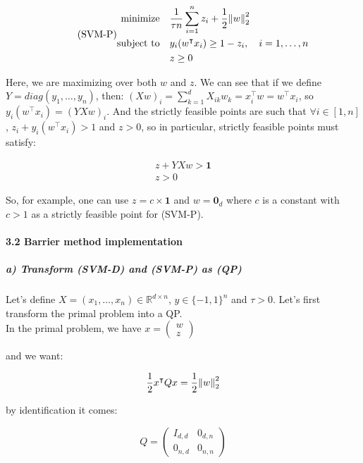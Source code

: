 \documentclass[11pt]{article}
\numberwithin{figure}{section} %
\begin{document}
\begin{equation}\tag*{(SVM-P)}
	\begin{split}
	\text{minimize} \quad & \frac{1}{\tau n} \sum\limits_{i=1}^n z_i + \frac{1}{2} \norm{w}^{2}_2 \\
	\text{subject to} \quad & y_i(w^{\intercal} x_i) \geq 1 - z_i, \quad i=1, \hdots, n \\
	& z \geq 0
	\end{split}
\end{equation}

Here, we are maximizing over both $w$ and $z$. We can see that if we define $Y = diag(y_1, \hdots, y_n)$, then:
$(Xw)_i = \sum\limits_{k=1}^d X_{ik}w_k = x^{\intercal}_i w = w^{\intercal} x_i$, so $y_i(w^{\intercal} x_i) =(YXw)_i$.
And the strictly feasible points are such that $\forall i \in [1,n]$, $z_i + y_i(w^{\intercal} x_i) > 1$ and $z > 0$, so
in particular, strictly feasible points must satisfy:

\begin{align*}
z + YXw > \mathbf{1} \\
z > 0
\end{align*}

So, for example, one can use $z = c \times \mathbf{1}$ and $w = \mathbf{0}_{d}$ where $c$ is a constant with $c > 1$ as a strictly feasible point for (SVM-P).

\paragraph{3.2 Barrier method implementation}
\subparagraph{a) Transform (SVM-D) and (SVM-P) as (QP)}
Let's define $X = (x_1, \hdots, x_n) \in \mathbb{R}^{d \times n}$, $y \in \{-1, 1\}^{n}$ and $\tau > 0$. Let's first transform the primal problem
into a QP. \\

In the primal problem, we have $x = \begin{pmatrix} 
w \\
z 
\end{pmatrix}$

and we want:

$$
\frac{1}{2}x^{\intercal} Q x = \frac{1}{2}\norm{w}^{2}_2
$$

by identification it comes:

\begin{framed} 
$$
Q = \begin{pmatrix} 
I_{d,d} &  0_{d,n}\\
0_{n,d} & 0_{n,n}
\end{pmatrix}
$$
\end{framed} 
\end{document}
